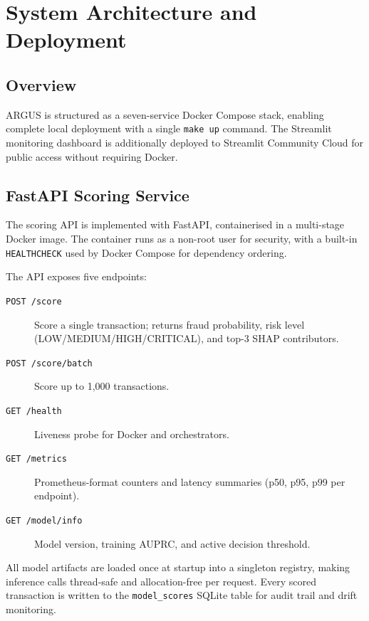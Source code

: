 ﻿%

\section{System Architecture and Deployment}
\label{sec:deployment}

\subsection{Overview}

ARGUS is structured as a seven-service Docker Compose stack, enabling
complete local deployment with a single \texttt{make up} command.
The Streamlit monitoring dashboard is additionally deployed to
Streamlit Community Cloud for public access without requiring Docker.

\subsection{FastAPI Scoring Service}

The scoring API is implemented with FastAPI, containerised in a multi-stage
Docker image. The container runs as a non-root user for security,
with a built-in \texttt{HEALTHCHECK} used by Docker Compose for dependency ordering.

The API exposes five endpoints:
\begin{description}
    \item[\texttt{POST /score}] Score a single transaction; returns
         fraud probability, risk level (LOW/MEDIUM/HIGH/CRITICAL),
         and top-3 SHAP contributors.
    \item[\texttt{POST /score/batch}] Score up to 1,000 transactions.
    \item[\texttt{GET /health}] Liveness probe for Docker and orchestrators.
    \item[\texttt{GET /metrics}] Prometheus-format counters and latency
         summaries (p50, p95, p99 per endpoint).
    \item[\texttt{GET /model/info}] Model version, training AUPRC, and
         active decision threshold.
\end{description}

All model artifacts are loaded once at startup into a singleton registry,
making inference calls thread-safe and allocation-free per request.
Every scored transaction is written to the \texttt{model\_scores} SQLite
table for audit trail and drift monitoring.

